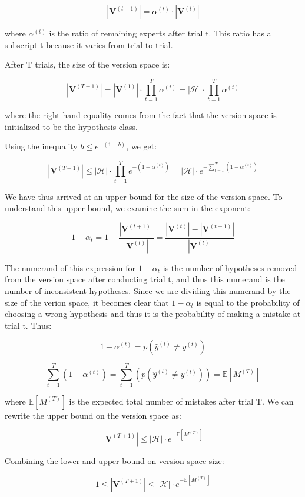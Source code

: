 \documentclass[11pt]{article}
\begin{document}
$$|\textbf{V}^{(t+1)}| = \alpha^{(t)} \cdot |\textbf{V}^{(t)}| $$

where $\alpha^{(t)}$ is the ratio of remaining experts after trial t. This ratio has a subscript t because it varies from trial to trial. 

After T trials, the size of the version space is:

$$|\textbf{V}^{(T+1)}| =  |\textbf{V}^{(1)}| \cdot \prod_{t=1}^{T} \alpha^{(t)} =  
|\mathcal{H}| \cdot \prod_{t=1}^{T} \alpha^{(t)}$$

where the right hand equality comes from the fact that the version space is initialized to be the hypothesis class.

Using the inequality $b \leq e^{-(1-b)}$, we get:

$$|\textbf{V}^{(T+1)}| \leq |\mathcal{H}| \cdot \prod_{t=1}^{T} e^{-(1-\alpha^{(t)})} = 
|\mathcal{H}| \cdot e^{-\sum_{t=1}^{T}(1-\alpha^{(t)})}$$

We have thus arrived at an upper bound for the size of the version space. To understand this upper bound, we examine the sum in the exponent:

$$1 - \alpha_t = 1 - \frac{|\textbf{V}^{(t+1)}|}{|\textbf{V}^{(t)}|} = 
\frac{|\textbf{V}^{(t)}| - |\textbf{V}^{(t+1)}|}{|\textbf{V}^{(t)}|}$$

The numerand of this expression for $1 - \alpha_t$ is the number of hypotheses removed from the version space after conducting trial t, and thus this numerand is the number of inconsistent hypotheses. Since we are dividing this numerand by the size of the verion space, it becomes clear that $1 - \alpha_t$ is equal to the probability of choosing a wrong hypothesis and thus it is the probability of making a mistake at trial t. Thus:

$$1 - \alpha^{(t)} = p(\hat{y}^{(t)} \neq {y}^{(t)}) $$

$$\sum_{t=1}^{T}(1-\alpha^{(t)}) = \sum_{t=1}^{T}(p(\hat{y}^{(t)} \neq {y}^{(t)})) = \mathbb{E} [M^{(T)}]$$

where $\mathbb{E} [M^{(T)}]$ is the expected total number of mistakes after trial T. We can rewrite the upper bound on the version space as:

$$|\textbf{V}^{(T+1)}| \leq |\mathcal{H}| \cdot e^{-\mathbb{E} [M^{(T)}]}$$

Combining the lower and upper bound on version space size:

$$1 \leq |\textbf{V}^{(T+1)}| \leq |\mathcal{H}| \cdot e^{-\mathbb{E} [M^{(T)}]}$$
\end{document}
